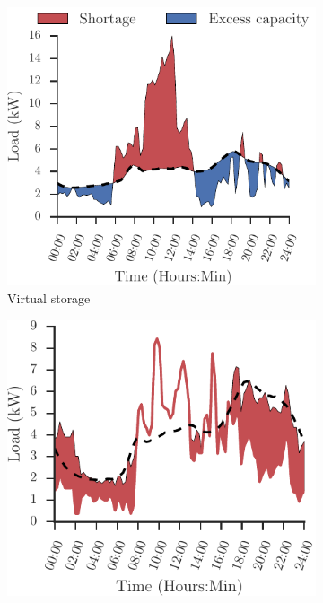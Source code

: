 \documentclass[conference]{IEEEtran}
\begin{document}
\begin{figure}[t!]
\centering
	\begin{subfigure}[b]{0.49\columnwidth}
	\includegraphics[width=1.1\textwidth, clip=true, trim=0 0 0 0.6cm]{figures/slp_shortage.pdf}
        \caption{Virtual storage}
        \label{fig:shortage_d}
    \end{subfigure}
    \begin{subfigure}[b]{0.49\columnwidth}
    \includegraphics[width=1.0\textwidth]{figures/movable.pdf}

\end{subfigure}
\end{figure}
\end{document}

